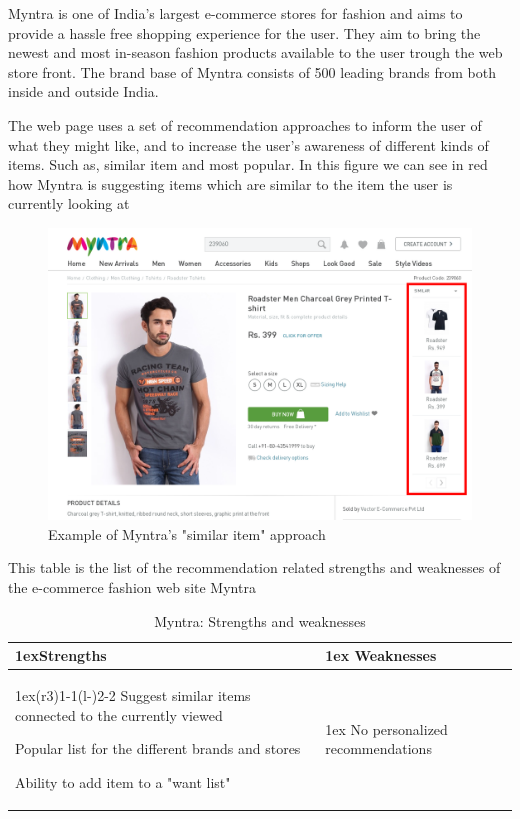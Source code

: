 Myntra is one of India's largest e-commerce stores for fashion and aims to
provide a hassle free shopping experience for the user.  They aim to bring the
newest and most in-season fashion products available to the user trough the web
store front.  The brand base of Myntra consists of 500 leading brands from both
inside and outside India.

The web page uses a set of recommendation approaches to inform the user of what
they might like, and to increase the user's awareness of different kinds of
items. Such as, similar item and most popular. In this figure we can see in red
how Myntra is suggesting items which are similar to the item the user is
currently looking at

\begin{figure}[H]
    \centering
    \includegraphics[scale=0.6]{image/myntiaSimilarExample.png}
    \caption[Example of Myntra's "similar item" approach]{Example of Myntra's
    "similar item" approach}
    \label{figure:myntiaSimilarEx}
\end{figure}

This table is the list of the recommendation related strengths and weaknesses
of the e-commerce fashion web site Myntra~\cite{myntra}

\begin{table}[H]
    \centering
    \begin{tabularx}{\linewidth}{>{\parskip1ex}X@{\kern4\tabcolsep}>{\parskip1ex}X}
        \toprule
        \hfil\bfseries Strengths
        &
        \hfil\bfseries Weaknesses
        \\\cmidrule(r{3\tabcolsep}){1-1}\cmidrule(l{-\tabcolsep}){2-2}
      Suggest similar items connected to the currently viewed \par
        Popular list for the different brands and stores \par
        Ability to add item to a "want list"\par
        &
        No personalized recommendations \par
        \\\bottomrule
    \end{tabularx}
    \caption{Myntra: Strengths and weaknesses}
    \label{table:ecommerceMyntra}
\end{table}

